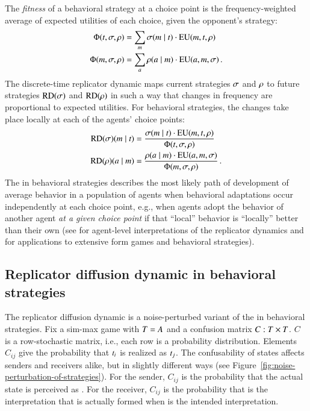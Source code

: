 \documentclass[fleqn,reqno,10pt]{article}
\newcommand{\rd}{\acro{rd}} %
\newcommand{\RD}{\ensuremath{\mathrm{RD}}} %
\begin{document}
The \emph{fitness} of a behavioral strategy at a choice point is the
frequency-weighted average of expected utilities of each choice, given
the opponent's strategy:
\begin{align*}
  \Phi(t,\sigma, \rho) & = \sum_{m} \sigma(m \mid t) \cdot
\mathrm{EU}(m, t,\rho) \\
\Phi(m,\sigma, \rho) & = \sum_{a} \rho(a \mid m)
\cdot \mathrm{EU}(a, m,\sigma)\,.
\end{align*}
The discrete-time replicator dynamic maps current strategies $\sigma$
and $\rho$ to future strategies $\RD(\Sstrat)$ and $\RD(\Rstrat)$
in such a way that changes in frequency are proportional to expected
utilities. For behavioral strategies, the changes take place locally
at each of the agents' choice points:
\begin{align*}
  \RD(\Sstrat)(\messg \probbar \state) & = \frac{\Sstrat(\messg \probbar \state) \cdot
    \EU(\messg, \state,\Rstrat)} {\Phi(\state,\Sstrat, \Rstrat)} \\
    \RD(\Rstrat)(\act \probbar \messg) & = \frac{\Rstrat(\act \probbar \messg) \cdot
    \EU(\act, \messg,\Sstrat)} {\Phi(\messg,\Sstrat, \Rstrat)}  \,.
\end{align*}
The \rd in behavioral strategies describes the most likely path of
development of average behavior in a population
of agents when behavioral adaptations occur independently at each
choice point, e.g., when agents adopt the behavior of another agent
\emph{at a given choice point} if that ``local'' behavior is
``locally'' better than their own (see
\citeauthor{Sandholm2013:Population-Game}
\citeyear{Sandholm2013:Population-Game} for agent-level
interpretations of the replicator dynamics and
\citeauthor{Cressman2003:Evolutionary-Dy}
\citeyear{Cressman2003:Evolutionary-Dy} for applications to extensive
form games and behavioral strategies).


\subsection{Replicator diffusion dynamic in behavioral strategies}
\label{sec:repl-diff-dynam-1}

The replicator diffusion dynamic is a noise-perturbed variant of the
\rd in behavioral strategies. Fix a sim-max game with $T =
A$ and a confusion matrix $C : T \times T$. $C$ is a
row-stochastic matrix, i.e., each row is a probability
distribution. Elements $C_{ij}$ give the probability that $t_i$
is realized as $t_j$. The confusability of states affects senders
and receivers alike, but in slightly different ways (see
Figure~\ref{fig:noise-perturbation-of-strategies}). For the sender,
$C_{ij}$ is the probability that the actual state  is
perceived as . For the receiver, $C_{ij}$ is the
probability that  is the interpretation that is actually
formed when  is the intended interpretation.
\end{document}
